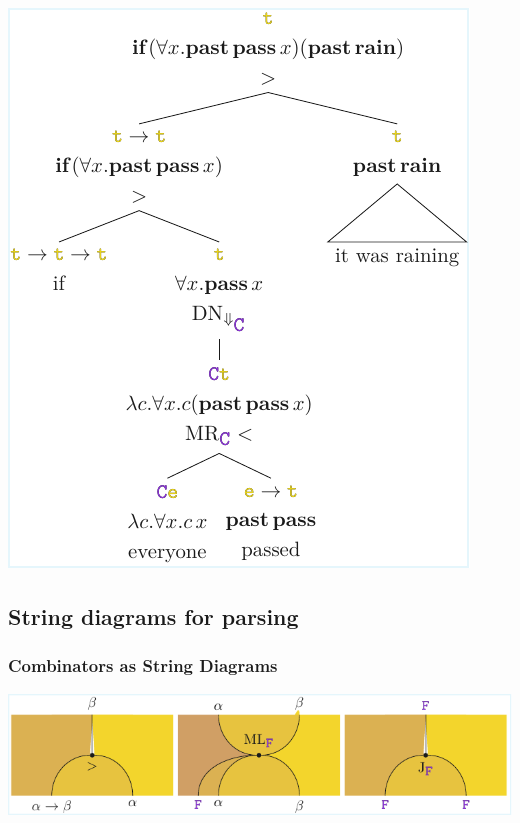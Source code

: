 \documentclass[math, english, info]{beamercours}
\begin{document}
\begin{frame}
	\begin{center}
		\includegraphics[height=.7\pageheight]{aux/figures/parse-tree-3.pdf}
	\end{center}
\end{frame}

\subsection{String diagrams for parsing}
\begin{frame}
	\frametitle{Combinators as String Diagrams}
	\includegraphics[width=\textwidth]{aux/figures/combinators-sd.pdf}
\end{frame}
\end{document}
